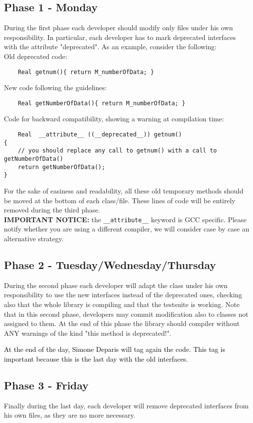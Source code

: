 \documentclass[10p]{article}
\newcommand{\newparts}[1]{\textcolor{black}{#1}}
\theoremstyle{definition}
\begin{document}
\subsection*{Phase 1 - Monday}
During the first phase each developer should modify only files under his own responsibility. In particular, each developer has to mark deprecated interfaces with the attribute "deprecated". As an example, consider the following:\\
Old deprecated code:
\begin{lstlisting}
    Real getnum(){ return M_numberOfData; }
\end{lstlisting}
New code following the guidelines:
\begin{lstlisting}
 	Real getNumberOfData(){ return M_numberOfData; }
\end{lstlisting}
Code for backward compatibility, showing a warning at compilation time:
\begin{lstlisting}
    Real  __attribute__ ((__deprecated__)) getnum()
{
    // you should replace any call to getnum() with a call to getNumberOfData()
	return getNumberOfData();
}
  \end{lstlisting}
For the sake of easiness and readability, all these old temporary methods should be moved at the bottom of each class/file. These lines of code will be entirely removed during the third phase.\\
\textbf{IMPORTANT NOTICE:} the \texttt{\_\_attribute\_\_} keyword is GCC specific. Please notify whether you are using a different compiler, we will consider case by case an alternative strategy.


\subsection*{Phase 2 - Tuesday/Wednesday/Thursday}
During the second phase each developer will adapt the class under his own responsibility to use the new interfaces instead of the deprecated ones, checking also that the whole library is compiling and that the testsuite is working. Note that in this second phase, developers may commit modification also to classes not assigned to them. At the end of this phase the library should compiler without ANY warnings of the kind "this method is deprecated!".

\newparts{At the end of the day, Simone Deparis will tag again the code. This tag is important because this is the last day with the old interfaces.}

\subsection*{Phase 3 - Friday}
Finally during the last day, each developer will remove deprecated interfaces from his own files, as they are no more necessary.
\end{document}
